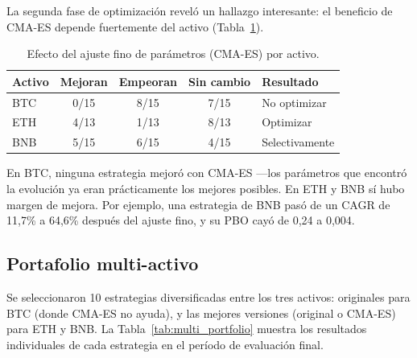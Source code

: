 \documentclass[12pt,a4paper]{article}
\begin{document}
La segunda fase de optimización reveló un hallazgo interesante: el beneficio de
CMA-ES depende fuertemente del activo (Tabla~\ref{tab:cmaes}).

\begin{table}[H]
\centering
\caption{Efecto del ajuste fino de parámetros (CMA-ES) por activo.}
\label{tab:cmaes}
\begin{tabular}{lcccl}
\toprule
\textbf{Activo} & \textbf{Mejoran} & \textbf{Empeoran} & \textbf{Sin cambio} & \textbf{Resultado} \\
\midrule
BTC & 0/15 & 8/15 & 7/15 & No optimizar \\
ETH & 4/13 & 1/13 & 8/13 & Optimizar \\
BNB & 5/15 & 6/15 & 4/15 & Selectivamente \\
\bottomrule
\end{tabular}
\end{table}

En BTC, ninguna estrategia mejoró con CMA-ES ---los parámetros que encontró la
evolución ya eran prácticamente los mejores posibles. En ETH y BNB sí hubo margen
de mejora. Por ejemplo, una estrategia de BNB pasó de un CAGR de 11,7\% a 64,6\%
después del ajuste fino, y su PBO cayó de 0,24 a 0,004.

\subsection{Portafolio multi-activo}

Se seleccionaron 10 estrategias diversificadas entre los tres activos: originales
para BTC (donde CMA-ES no ayuda), y las mejores versiones (original o CMA-ES)
para ETH y BNB. La Tabla~\ref{tab:multi_portfolio} muestra los resultados
individuales de cada estrategia en el período de evaluación final.
\end{document}
